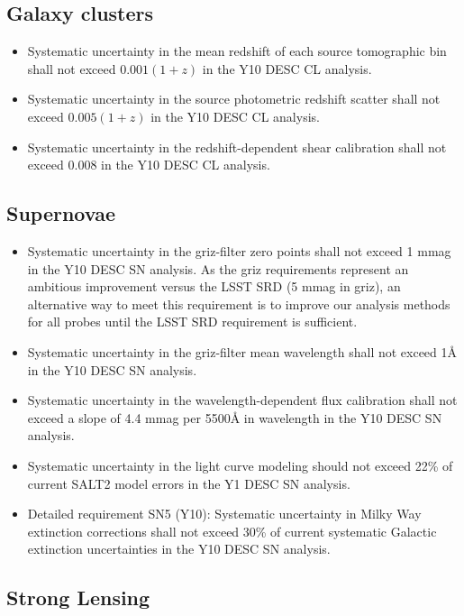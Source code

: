 \documentclass[modern]{desc-tex/styles/lsstdescnote}
\begin{document}
\subsection{Galaxy clusters}

\begin{itemize}
\item Systematic uncertainty in the mean redshift of each source tomographic bin shall not exceed $ 0.001( 1 + z)$ in the Y10 DESC CL analysis.
\item Systematic uncertainty in the source photometric redshift scatter shall not exceed $0.005 (1 + z)$ in the Y10 DESC CL analysis.
\item Systematic uncertainty in the redshift-dependent shear calibration shall not exceed 0.008 in the Y10 DESC CL analysis.
\end{itemize}

\subsection{Supernovae}


\begin{itemize}
\item Systematic uncertainty in the griz-filter zero points shall not exceed 1 mmag in the Y10 DESC SN analysis. As the griz requirements represent an ambitious improvement versus the LSST SRD (5 mmag in griz), an alternative way to meet this requirement is to improve our analysis methods for all probes until the LSST SRD requirement is sufficient.
\item Systematic uncertainty in the griz-filter mean wavelength shall not exceed 1\AA{} in the Y10 DESC SN analysis.
\item  Systematic uncertainty in the wavelength-dependent flux calibration shall not exceed a slope of 4.4 mmag per 5500\AA{} in wavelength in the Y10 DESC SN analysis.
\item Systematic uncertainty in the light curve modeling should not exceed 22\% of current SALT2 model errors in the Y1 DESC SN analysis.
\item Detailed requirement SN5 (Y10): Systematic uncertainty in Milky Way extinction corrections shall not exceed 30\% of current systematic Galactic extinction uncertainties in the Y10 DESC SN analysis.
\end{itemize}


\subsection{Strong Lensing}
\end{document}
